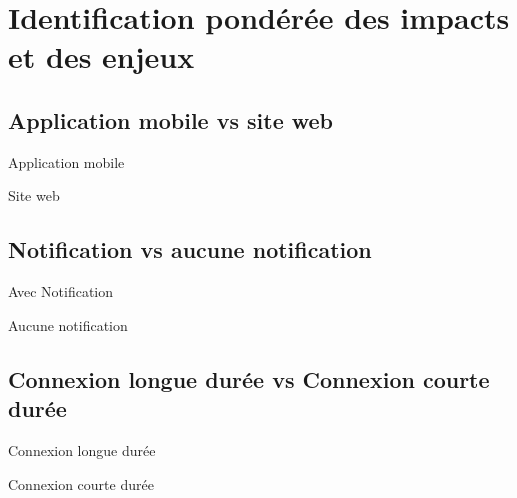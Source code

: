 \section{Identification pondérée des impacts et des enjeux}
	\subsection{Application mobile vs site web}
	\lipsumC

	\begin{table}[hp]
		\centering
		\caption{Application mobile}
		
		\label{tab.app+}
	\end{table}
	
	\begin{table}[hp]
		\centering
		\caption{Site web}
		
		\label{tab.app-}
	\end{table}
	
	\subsection{Notification vs aucune notification}
	\lipsumC

	\begin{table}[hp]
		\centering
		\caption{Avec Notification}
		
		\label{tab.notif+}
	\end{table}
	
	\begin{table}[hp]
		\centering
		\caption{Aucune notification}
		
		\label{tab.notif-}
	\end{table}
	
	\subsection{Connexion longue durée vs Connexion courte durée}
	\lipsumC

	\begin{table}[hp]
		\centering
		\caption{Connexion longue durée}
		
		\label{tab.connexion+}
	\end{table}
	
	\begin{table}[hp]
		\centering
		\caption{Connexion courte durée}
		
		\label{tab.connexion-}
	\end{table}